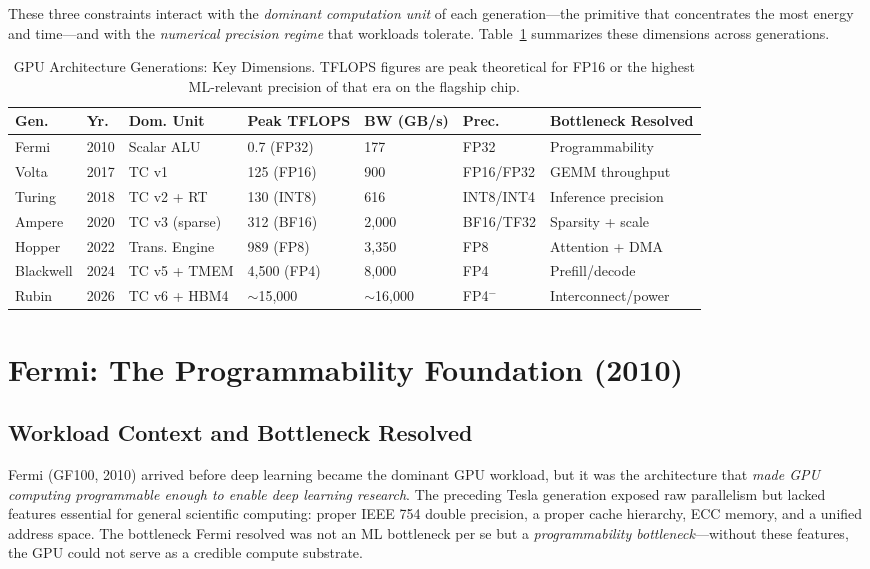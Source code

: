 \documentclass[10pt,twocolumn]{article}
\begin{document}
These three constraints interact with the \textit{dominant computation unit} of each generation—the primitive that concentrates the most energy and time—and with the \textit{numerical precision regime} that workloads tolerate. Table~\ref{tab:overview} summarizes these dimensions across generations.

\begin{table}[t]
\centering
\caption{GPU Architecture Generations: Key Dimensions. TFLOPS figures are peak theoretical for FP16 or the highest ML-relevant precision of that era on the flagship chip.}
\label{tab:overview}
\setlength{\tabcolsep}{3pt}
\footnotesize
\begin{tabular}{@{}lllllll@{}}
\toprule
\textbf{Gen.} & \textbf{Yr.} & \textbf{Dom. Unit} & \textbf{Peak TFLOPS} & \textbf{BW (GB/s)} & \textbf{Prec.} & \textbf{Bottleneck Resolved} \\
\midrule
Fermi     & 2010 & Scalar ALU        & 0.7 (FP32)    & 177   & FP32          & Programmability \\
Volta     & 2017 & TC v1             & 125 (FP16)    & 900   & FP16/FP32     & GEMM throughput \\
Turing    & 2018 & TC v2 + RT        & 130 (INT8)    & 616   & INT8/INT4     & Inference precision \\
Ampere    & 2020 & TC v3 (sparse)    & 312 (BF16)    & 2,000 & BF16/TF32     & Sparsity + scale \\
Hopper    & 2022 & Trans. Engine     & 989 (FP8)     & 3,350 & FP8           & Attention + DMA \\
Blackwell & 2024 & TC v5 + TMEM      & 4,500 (FP4)   & 8,000 & FP4           & Prefill/decode \\
Rubin     & 2026 & TC v6 + HBM4      & $\sim$15,000  & $\sim$16,000 & FP4$^-$ & Interconnect/power \\
\bottomrule
\end{tabular}
\end{table}

\section{Fermi: The Programmability Foundation (2010)}
\label{sec:fermi}

\subsection{Workload Context and Bottleneck Resolved}

Fermi (GF100, 2010) arrived before deep learning became the dominant GPU workload, but it was the architecture that \textit{made GPU computing programmable enough to enable deep learning research}. The preceding Tesla generation exposed raw parallelism but lacked features essential for general scientific computing: proper IEEE 754 double precision, a proper cache hierarchy, ECC memory, and a unified address space. The bottleneck Fermi resolved was not an ML bottleneck per se but a \textit{programmability bottleneck}—without these features, the GPU could not serve as a credible compute substrate.
\end{document}
